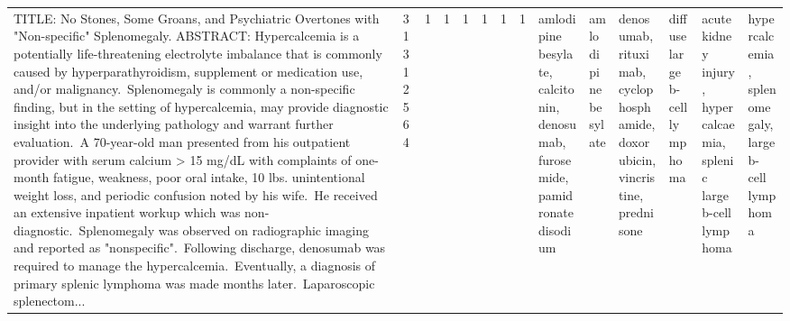 \begin{longtable}{llllllllllllll}
TITLE: No Stones, Some Groans, and Psychiatric Overtones with "Non-specific" Splenomegaly. ABSTRACT: Hypercalcemia is a potentially life-threatening electrolyte imbalance that is commonly caused by hyperparathyroidism, supplement or medication use, and/or malignancy. Splenomegaly is commonly a non-specific finding, but in the setting of hypercalcemia, may provide diagnostic insight into the underlying pathology and warrant further evaluation. A 70-year-old man presented from his outpatient provider with serum calcium > 15 mg/dL with complaints of one-month fatigue, weakness, poor oral intake, 10 lbs. unintentional weight loss, and periodic confusion noted by his wife. He received an extensive inpatient workup which was non-diagnostic. Splenomegaly was observed on radiographic imaging and reported as "nonspecific". Following discharge, denosumab was required to manage the hypercalcemia. Eventually, a diagnosis of primary splenic lymphoma was made months later. Laparoscopic splenectom... & 31312564 &              1 &                     1 &             1 &                 1 &                        1 &                1 &                                                                                                                                                                                    amlodipine besylate, calcitonin, denosumab, furosemide, pamidronate disodium &                                                                                               amlodipine besylate &                                                                                                                                           denosumab, rituximab, cyclophosphamide, doxorubicin, vincristine, prednisone &                                                                                                                                    diffuse large b-cell lymphoma &                                                                                                                                                                                                acute kidney injury, hypercalcaemia, splenic large b-cell lymphoma &                                                            hypercalcemia, splenomegaly, large b-cell lymphoma \\

\end{longtable}
